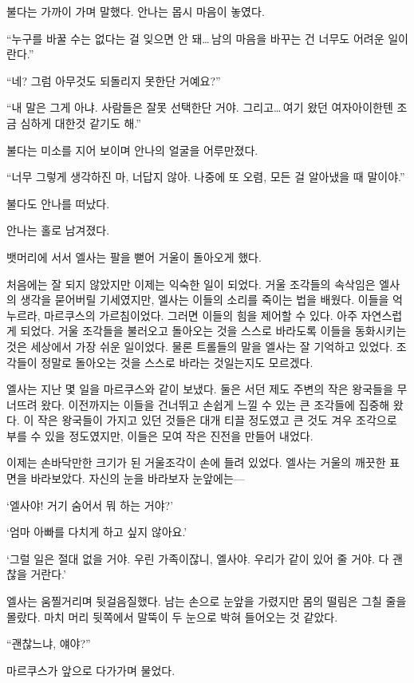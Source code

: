 불다는 가까이 가며 말했다. 안나는 몹시 마음이 놓였다.

``누구를 바꿀 수는 없다는 걸 잊으면 안 돼\ldots\,남의 마음을 바꾸는 건 너무도 어려운 일이란다.''

``네? 그럼 아무것도 되돌리지 못한단 거예요?''

``내 말은 그게 아냐. 사람들은 잘못 선택한단 거야. 그리고\ldots\,여기 왔던 여자아이한텐 조금 심하게 대한것 같기도 해.''

불다는 미소를 지어 보이며 안나의 얼굴을 어루만졌다.

``너무 그렇게 생각하진 마, 너답지 않아. 나중에 또 오렴, 모든 걸 알아냈을 때 말이야.''

불다도 안나를 떠났다.

안나는 홀로 남겨졌다.

\textbreak

뱃머리에 서서 엘사는 팔을 뻗어 거울이 돌아오게 했다.

처음에는 잘 되지 않았지만 이제는 익숙한 일이 되었다. 거울 조각들의 속삭임은 엘사의 생각을 묻어버릴 기세였지만, 엘사는 이들의 소리를 죽이는 법을 배웠다. 이들을 억누르라, 마르쿠스의 가르침이었다. 그러면 이들의 힘을 제어할 수 있다. 아주 자연스럽게 되었다. 거울 조각들을 불러오고 돌아오는 것을 스스로 바라도록 이들을 동화시키는 것은 세상에서 가장 쉬운 일이었다. 물론 트롤들의 말을 엘사는 잘 기억하고 있었다. 조각들이 정말로 돌아오는 것을 스스로 바라는 것일는지도 모르겠다.

엘사는 지난 몇 일을 마르쿠스와 같이 보냈다. 둘은 서던 제도 주변의 작은 왕국들을 무너뜨려 왔다. 이전까지는 이들을 건너뛰고 손쉽게 느낄 수 있는 큰 조각들에 집중해 왔다. 이 작은 왕국들이 가지고 있던 것들은 대개 티끌 정도였고 큰 것도 겨우 조각으로 부를 수 있을 정도였지만, 이들은 모여 작은 진전을 만들어 내었다.

이제는 손바닥만한 크기가 된 거울조각이 손에 들려 있었다. 엘사는 거울의 깨끗한 표면을 바라보았다. 자신의 눈을 바라보자 눈앞에는—

`엘사야! 거기 숨어서 뭐 하는 거야?'

`엄마 아빠를 다치게 하고 싶지 않아요.'

`그럴 일은 절대 없을 거야. 우린 가족이잖니, 엘사야. 우리가 같이 있어 줄 거야. 다 괜찮을 거란다.'

엘사는 움찔거리며 뒷걸음질했다. 남는 손으로 눈앞을 가렸지만 몸의 떨림은 그칠 줄을 몰랐다. 마치 머리 뒷쪽에서 말뚝이 두 눈으로 박혀 들어오는 것 같았다.

``괜찮느냐, 얘야?''

마르쿠스가 앞으로 다가가며 물었다.

